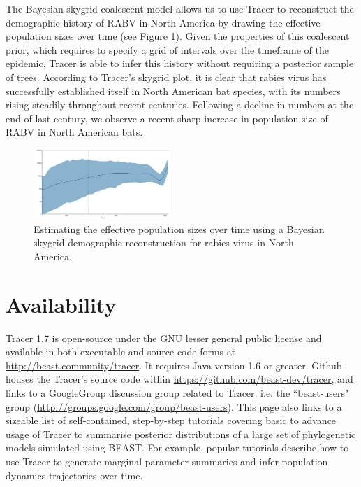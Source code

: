 \documentclass{bioinfo}
\begin{document}
The Bayesian skygrid coalescent model \citep{gill2012improving} allows us to use Tracer to reconstruct the demographic history of RABV in North America by drawing the effective population sizes over time (see Figure \ref{fig:rabv}).
Given the properties of this coalescent prior, which requires to specify a grid of intervals over the timeframe of the epidemic, Tracer is able to infer this history without requiring a posterior sample of trees.
According to Tracer's skygrid plot, it is clear that rabies virus has successfully established itself in North American bat species, with its numbers rising steadily throughout recent centuries.
Following a decline in numbers at the end of last century, we observe a recent sharp increase in population size of RABV in North American bats.


\begin{figure}[ht]
\centerline{
\includegraphics[width=0.46\textwidth]{./figures/rabv-skygrid.pdf}
}
\caption{Estimating the effective population sizes over time using a Bayesian skygrid demographic reconstruction for rabies virus in North America.}
\label{fig:rabv}
\end{figure}



\section*{Availability}

Tracer 1.7 is open-source under the GNU lesser general public license and available in both executable and source code forms at \url{http://beast.community/tracer}.
It requires Java version 1.6 or greater.
Github houses the Tracer's source code within \url{https://github.com/beast-dev/tracer}, and links to a GoogleGroup discussion group related to Tracer, i.e. the ``beast-users" group (\url{http://groups.google.com/group/beast-users}).
This page also links to a sizeable list of self-contained, step-by-step tutorials covering basic to advance usage of Tracer to summarise posterior distributions of a large set of phylogenetic models simulated using BEAST.
For example, popular tutorials describe how to use Tracer to generate marginal parameter summaries and infer population dynamics trajectories over time.
\end{document}
